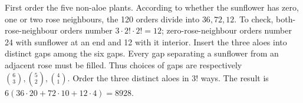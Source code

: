 First order the five non-aloe plants. According to whether the sunflower has zero, one or two rose neighbours, the 120 orders divide into $36,72,12$. To check, both-rose-neighbour orders number $3\cdot2!\cdot2!=12$; zero-rose-neighbour orders number 24 with sunflower at an end and 12 with it interior. Insert the three aloes into distinct gaps among the six gaps. Every gap separating a sunflower from an adjacent rose must be filled. Thus choices of gaps are respectively $\binom63,\binom52,\binom41$. Order the three distinct aloes in $3!$ ways. The result is $6(36\cdot20+72\cdot10+12\cdot4)=\boxed{8928}$.
